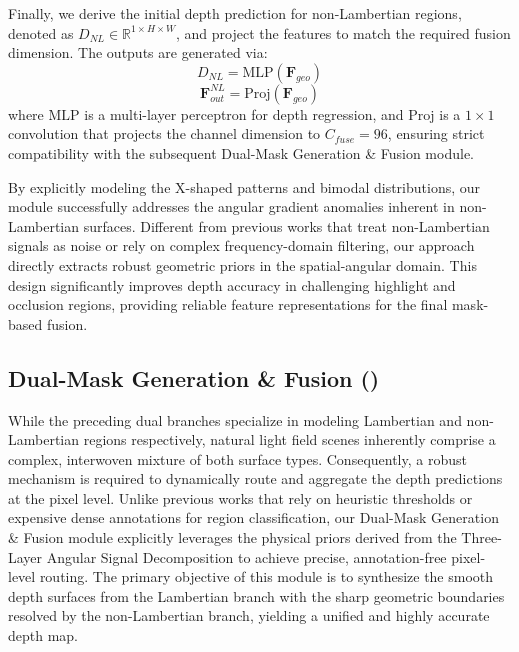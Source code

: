 \documentclass[lettersize,journal]{IEEEtran}
\begin{document}
Finally, we derive the initial depth prediction for non-Lambertian regions, denoted as $D_{NL} \in \mathbb{R}^{1 \times H \times W}$, and project the features to match the required fusion dimension. The outputs are generated via:
\begin{equation}
\label{eq:eq15}
D_{NL} = \text{MLP}(\mathbf{F}_{geo})
\end{equation}
\begin{equation}
\label{eq:eq16}
\mathbf{F}_{out}^{NL} = \text{Proj}(\mathbf{F}_{geo})
\end{equation}
where $\text{MLP}$ is a multi-layer perceptron for depth regression, and $\text{Proj}$ is a $1 \times 1$ convolution that projects the channel dimension to $C_{fuse}=96$, ensuring strict compatibility with the subsequent Dual-Mask Generation \& Fusion module.

By explicitly modeling the X-shaped patterns and bimodal distributions, our module successfully addresses the angular gradient anomalies inherent in non-Lambertian surfaces. Different from previous works that treat non-Lambertian signals as noise or rely on complex frequency-domain filtering, our approach directly extracts robust geometric priors in the spatial-angular domain. This design significantly improves depth accuracy in challenging highlight and occlusion regions, providing reliable feature representations for the final mask-based fusion.

\subsection{Dual-Mask Generation \& Fusion ()}

While the preceding dual branches specialize in modeling Lambertian and non-Lambertian regions respectively, natural light field scenes inherently comprise a complex, interwoven mixture of both surface types. Consequently, a robust mechanism is required to dynamically route and aggregate the depth predictions at the pixel level. Unlike previous works that rely on heuristic thresholds or expensive dense annotations for region classification, our Dual-Mask Generation \& Fusion module explicitly leverages the physical priors derived from the Three-Layer Angular Signal Decomposition to achieve precise, annotation-free pixel-level routing. The primary objective of this module is to synthesize the smooth depth surfaces from the Lambertian branch with the sharp geometric boundaries resolved by the non-Lambertian branch, yielding a unified and highly accurate depth map.
\end{document}
